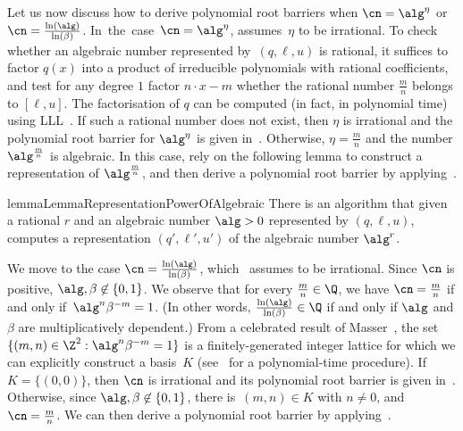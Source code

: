 Let us now discuss how to derive polynomial root barriers when $\cn = \alg^\eta$
or $\cn = \frac{\ln(\alg)}{\ln(\beta)}$. In~the~case~$\cn = \alg^\eta$,
 assumes~$\eta$ to be irrational. To check
whether an algebraic number represented by~$(q,\ell,u)$ is rational, it suffices
to factor $q(x)$ into a product of irreducible polynomials with rational
coefficients, and test for any degree $1$ factor $n \cdot x - m$ whether the
rational number $\frac{m}{n}$ belongs to $[\ell,u]$. The factorisation of $q$
can be computed (in fact, in polynomial time) using LLL~\cite{lenstra1982}. If
such a rational number does not exist, then $\eta$ is irrational and
the polynomial root barrier for $\alg^\eta$ is given
in~. Otherwise, $\eta = \frac{m}{n}$ and the
number $\alg^{\frac{m}{n}}$ is algebraic. In this case, rely on the following
lemma to construct a representation of $\alg^{\frac{m}{n}}$, and then derive a
polynomial root barrier by applying~.

\begin{restatable}{lemma}{LemmaRepresentationPowerOfAlgebraic}
  \label{lemma:representation-power-of-algebraic}
  There is an algorithm that given a rational $r$ and an algebraic number $\alg > 0$ 
  represented by $(q,\ell,u)$, computes a representation $(q',\ell',u')$ 
  of the algebraic number $\alg^r$.
\end{restatable}

We move to the case $\cn = \frac{\ln(\alg)}{\ln(\beta)}$,
which~ assumes to be irrational. Since $\cn$
is positive, $\alg,\beta \not\in \{0,1\}$. We observe that for every
$\frac{m}{n} \in \Q$, we have $\cn = \frac{m}{n}$ if
and only if~${\alg^n \beta^{-m} = 1}$. (In other words,
$\frac{\ln(\alg)}{\ln(\beta)} \in \Q$ if and only if $\alg$ and $\beta$ are
multiplicatively dependent.) From a celebrated result of Masser~\cite{Masser88},
the set $\{(m,n) \in \Z^2 : \alg^n \beta^{-m} = 1\}$ is a
finitely-generated integer lattice for which we can explicitly construct a
basis~$K$ (see~\cite{CaiLZ00} for a polynomial-time procedure). If $K =
\{(0,0)\}$, then $\cn$ is irrational and its polynomial
root barrier is given in~. Otherwise, since
$\alg,\beta \not \in \{0,1\}$, there is~$(m,n) \in K$ with $n \neq 0$, and
$\cn = \frac{m}{n}$. We can then derive a polynomial
root barrier by applying~.





